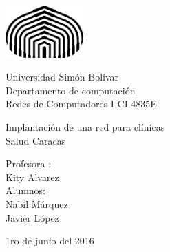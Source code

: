 \documentclass[]{article}
\begin{document}


\begin{titlepage}

\setlength{\hoffset}{-1in}
\setlength{\voffset}{-1in}
\setlength{\topmargin}{1.5cm}
\setlength{\headheight}{0.5cm}
\setlength{\headsep}{1cm}
\setlength{\oddsidemargin}{3cm}
\setlength{\evensidemargin}{3cm}
\setlength{\footskip}{1.5cm}
\enlargethispage{1cm}

\fontsize{12pt}{14pt}
\selectfont

\begin{center}

\includegraphics[height=2cm]{logo.png}

\vspace{0.5cm}

Universidad Sim\'on Bol\'ivar\\
Departamento de computaci\'on\\
Redes de Computadores I CI-4835E\\

\vspace{3.5cm}

\fontsize{17.28pt}{21pt}
\selectfont

Implantaci\'on de una red para cl\'inicas\\
Salud Caracas

\fontsize{12pt}{14pt}
\selectfont

\vspace{.6cm}



\vspace{.4cm}


\vspace{3.5cm}

Profesora : \\
Kity Alvarez\\
Alumnos: \\
Nabil M\'arquez\\
Javier  L\'opez

\vspace{2cm}


\vspace{1cm}

1ro de junio del 2016

\end{center}
\end{titlepage}
\end{document}
